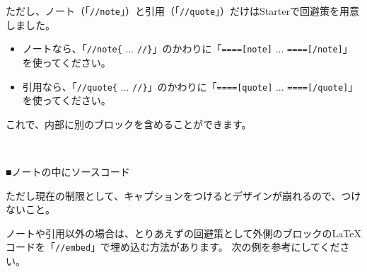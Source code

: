 ただし、ノート（「\texttt{//note}」）と引用（「\texttt{//quote}」）だけはStarterで回避策を用意しました。

\begin{itemize}
\item ノートなら、「\texttt{//note\{} ... \texttt{//\}}」のかわりに「\texttt{====[note]} ... \texttt{====[/note]}」を使ってください。
\item 引用なら、「\texttt{//quote\{} ... \texttt{//\}}」のかわりに「\texttt{====[quote]} ... \texttt{====[/quote]}」を使ってください。
\end{itemize}

これで、内部に別のブロックを含めることができます。

\begin{starterprogram}\end{starterprogram}
\noindent
{}\\

\begin{starternote}{■ノートの中にソースコード}
\begin{starternoteinner}

ただし現在の制限として、キャプションをつけるとデザインが崩れるので、つけないこと。

\end{starternoteinner}
\begin{starterprogram}\end{starterprogram}
\end{starternote}
\vspace*{\baselineskip}

ノートや引用以外の場合は、とりあえずの回避策として外側のブロックの\LaTeX{}コードを「\texttt{//embed}」で埋め込む方法があります。
次の例を参考にしてください。

\begin{starterprogram}\end{starterprogram}
\noindent
{}\\

